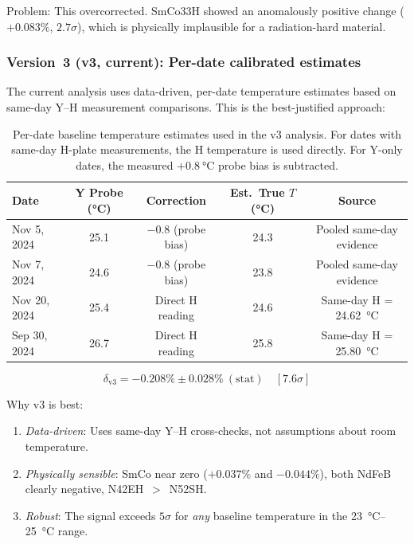 \documentclass[11pt,letterpaper]{article}
\newcommand{\ndfeb}{NdFeB}
\begin{document}
Problem: This overcorrected. SmCo33H showed an anomalously positive
change ($+0.083\%$, $2.7\sigma$), which is physically implausible for a
radiation-hard material.

\subsubsection{Version~3 (v3, current): Per-date calibrated estimates}

The current analysis uses data-driven, per-date temperature estimates based on
same-day Y--H measurement comparisons. This is the best-justified approach:

\begin{table}[H]
\centering
\caption{Per-date baseline temperature estimates used in the v3 analysis. For
dates with same-day H-plate measurements, the H temperature is used directly.
For Y-only dates, the measured $+\SI{0.8}{\celsius}$ probe bias is subtracted.}
\label{tab:temp_v3}
\begin{tabular}{@{}lcccc@{}}
\toprule
\textbf{Date} & \textbf{Y Probe (\si{\celsius})} &
\textbf{Correction} & \textbf{Est.\ True $T$ (\si{\celsius})} &
\textbf{Source} \\
\midrule
Nov 5, 2024  & 25.1 & $-0.8$ (probe bias) & 24.3 & Pooled same-day evidence \\
Nov 7, 2024  & 24.6 & $-0.8$ (probe bias) & 23.8 & Pooled same-day evidence \\
Nov 20, 2024 & 25.4 & Direct H reading    & 24.6 & Same-day H = \SI{24.62}{\celsius} \\
Sep 30, 2024 & 26.7 & Direct H reading    & 25.8 & Same-day H = \SI{25.80}{\celsius} \\
\bottomrule
\end{tabular}
\end{table}

\begin{equation*}
    \delta_\mathrm{v3} = -0.208\% \pm 0.028\%~(\mathrm{stat}) \quad [7.6\sigma]
\end{equation*}

Why v3 is best:
\begin{enumerate}
    \item \emph{Data-driven}: Uses same-day Y--H cross-checks, not
    assumptions about room temperature.
    \item \emph{Physically sensible}: SmCo near zero ($+0.037\%$ and
    $-0.044\%$), both \ndfeb{} clearly negative, N42EH~$>$~N52SH.
    \item \emph{Robust}: The signal exceeds $5\sigma$ for \emph{any}
    baseline temperature in the \SIrange{23}{25}{\celsius} range.
\end{enumerate}
\end{document}
